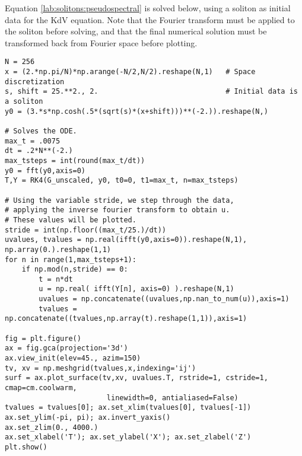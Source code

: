 Equation \eqref{lab:solitons:pseudospectral} is solved below, using a soliton as initial data for the KdV equation. 
Note that the Fourier transform must be applied to the soliton before solving, and that the final numerical solution must be transformed back from Fourier space before plotting. 
\begin{lstlisting}
N = 256
x = (2.*np.pi/N)*np.arange(-N/2,N/2).reshape(N,1)   # Space discretization
s, shift = 25.**2., 2.  							# Initial data is a soliton
y0 = (3.*s*np.cosh(.5*(sqrt(s)*(x+shift)))**(-2.)).reshape(N,) 

# Solves the ODE.
max_t = .0075
dt = .2*N**(-2.)
max_tsteps = int(round(max_t/dt))
y0 = fft(y0,axis=0)
T,Y = RK4(G_unscaled, y0, t0=0, t1=max_t, n=max_tsteps)

# Using the variable stride, we step through the data, 
# applying the inverse fourier transform to obtain u.
# These values will be plotted.
stride = int(np.floor((max_t/25.)/dt))
uvalues, tvalues = np.real(ifft(y0,axis=0)).reshape(N,1), np.array(0.).reshape(1,1)
for n in range(1,max_tsteps+1):
	if np.mod(n,stride) == 0:
		t = n*dt
		u = np.real( ifft(Y[n], axis=0) ).reshape(N,1)
		uvalues = np.concatenate((uvalues,np.nan_to_num(u)),axis=1)
		tvalues = np.concatenate((tvalues,np.array(t).reshape(1,1)),axis=1)

fig = plt.figure()
ax = fig.gca(projection='3d')
ax.view_init(elev=45., azim=150)
tv, xv = np.meshgrid(tvalues,x,indexing='ij')
surf = ax.plot_surface(tv,xv, uvalues.T, rstride=1, cstride=1, cmap=cm.coolwarm,
						linewidth=0, antialiased=False)
tvalues = tvalues[0]; ax.set_xlim(tvalues[0], tvalues[-1])
ax.set_ylim(-pi, pi); ax.invert_yaxis()
ax.set_zlim(0., 4000.)
ax.set_xlabel('T'); ax.set_ylabel('X'); ax.set_zlabel('Z')
plt.show()
\end{lstlisting}

